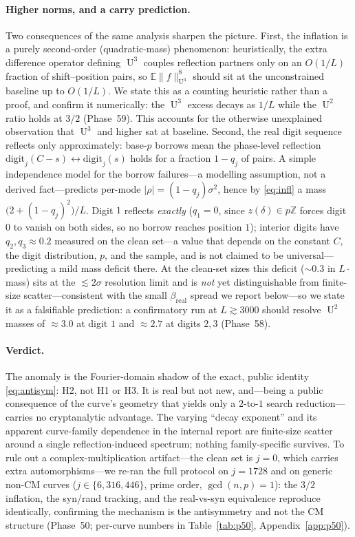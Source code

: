 \documentclass[11pt]{article}
\theoremstyle{definition}
\newcommand{\Z}{\mathbb{Z}}
\DeclareMathOperator{\Uk}{U}
\begin{document}
\paragraph{Higher norms, and a carry prediction.} Two consequences of the
same analysis sharpen the picture. First, the inflation is a purely
second-order (quadratic-mass) phenomenon: heuristically, the extra
difference operator defining $\Uk^3$ couples reflection partners only on
an $O(1/L)$ fraction of shift--position pairs, so
$\mathbb E\|f\|_{\Uk^3}^8$ should sit at the unconstrained baseline up to
$O(1/L)$. We state this as a counting heuristic rather than a proof, and
confirm it numerically: the $\Uk^3$ excess decays as $1/L$ while the
$\Uk^2$ ratio holds at $3/2$ (Phase~59). This accounts for the otherwise
unexplained observation that $\Uk^3$ and higher sat at baseline. Second,
the real digit sequence reflects only approximately: base-$p$ borrows
mean the phase-level reflection
$\mathrm{digit}_j(C-s)\leftrightarrow\mathrm{digit}_j(s)$ holds for a
fraction $1-q_j$ of pairs. A simple independence model for the borrow
failures---a modelling assumption, not a derived fact---predicts per-mode
$|\rho|=(1-q_j)\sigma^2$, hence by \eqref{eq:infl} a mass
$\big(2+(1-q_j)^2\big)/L$. Digit $1$ reflects \emph{exactly} ($q_1=0$,
since $z(\delta)\in p\Z$ forces digit $0$ to vanish on both sides, so no
borrow reaches position $1$); interior digits have $q_2,q_3\approx0.2$
measured on the clean set---a value that depends on the constant $C$, the
digit distribution, $p$, and the sample, and is not claimed to be
universal---predicting a mild mass deficit there. At the
clean-set sizes this deficit ($\sim0.3$ in $L\cdot$mass) sits at the
$\lesssim2\sigma$ resolution limit and is \emph{not} yet distinguishable
from finite-size scatter---consistent with the small
$\beta_{\mathrm{real}}$ spread we report below---so we state it as a
falsifiable prediction: a confirmatory run at $L\gtrsim3000$ should resolve
$\Uk^2$ masses of $\approx3.0$ at digit $1$ and $\approx2.7$ at digits
$2,3$ (Phase~58).

\paragraph{Verdict.} The anomaly is the Fourier-domain shadow of the
exact, public identity \eqref{eq:antisym}: H2, not H1 or H3. It is real
but not new, and---being a public consequence of the curve's geometry
that yields only a $2$-to-$1$ search reduction---carries no cryptanalytic
advantage. The varying ``decay exponent'' and its apparent curve-family
dependence in the internal report are finite-size scatter around a single
reflection-induced spectrum; nothing family-specific survives. To rule out
a complex-multiplication artifact---the clean set is $j{=}0$, which carries
extra automorphisms---we re-ran the full protocol on $j{=}1728$ and on
generic non-CM curves ($j\in\{6,316,446\}$, prime order, $\gcd(n,p)=1$):
the $3/2$ inflation, the syn/rand tracking, and the real-vs-syn
equivalence reproduce identically, confirming the mechanism is the
antisymmetry and not the CM structure (Phase~50; per-curve numbers in
Table~\ref{tab:p50}, Appendix~\ref{app:p50}).
\end{document}
